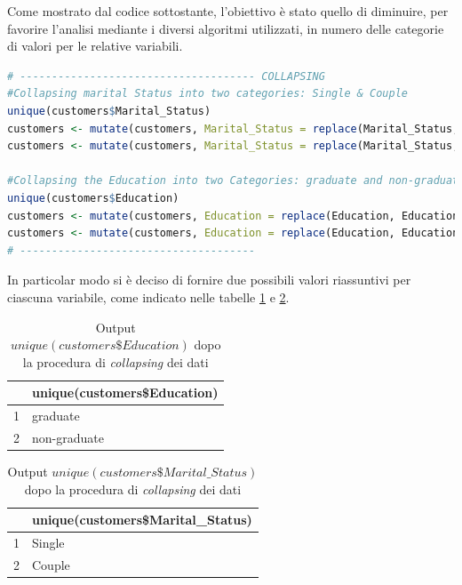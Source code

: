 \documentclass[letterpaper,11pt]{article}
\begin{document}
Come mostrato dal codice sottostante, l'obiettivo è stato quello di diminuire, per favorire l'analisi mediante i diversi algoritmi utilizzati, in numero delle categorie di valori per le relative variabili. 
\begin{lstlisting}[language=R]
# ------------------------------------- COLLAPSING
#Collapsing marital Status into two categories: Single & Couple
unique(customers$Marital_Status)
customers <- mutate(customers, Marital_Status = replace(Marital_Status, Marital_Status == "Divorced" | Marital_Status == "Widow" | Marital_Status == "Alone" | Marital_Status == "Absurd" | Marital_Status == "YOLO", "Single"))
customers <- mutate(customers, Marital_Status = replace(Marital_Status, Marital_Status == "Together" | Marital_Status == "Married", "Couple"))

#Collapsing the Education into two Categories: graduate and non-graduate
unique(customers$Education)
customers <- mutate(customers, Education = replace(Education, Education == "Graduation"| Education == "PhD" | Education == "Master", "graduate"))
customers <- mutate(customers, Education = replace(Education, Education == "Basic"| Education == "2n Cycle", "non-graduate"))
# ------------------------------------- 
\end{lstlisting}
In particolar modo si è deciso di fornire due possibili valori riassuntivi per ciascuna variabile, come indicato nelle tabelle \ref{fig:unique(customersEducation)2} e \ref{fig:unique(customersMaritalStatus)2}.

\begin{table}[h!t]
\centering
\begin{tabular}{rl}
  \hline
 & unique(customers\$Education) \\ 
  \hline
1 & graduate \\ 
  2 & non-graduate \\ 
   \hline
\end{tabular}
\caption{Output $unique(customers\$Education)$ dopo la procedura di \textit{collapsing} dei dati}
\label{fig:unique(customersEducation)2}
\end{table}


\begin{table}[h!t]
\centering
\begin{tabular}{rl}
  \hline
 & unique(customers\$Marital\_Status) \\ 
  \hline
1 & Single \\ 
  2 & Couple \\ 
   \hline
\end{tabular}
\caption{Output $unique(customers\$Marital\_Status)$ dopo la procedura di \textit{collapsing} dei dati}
\label{fig:unique(customersMaritalStatus)2}
\end{table}
\end{document}
